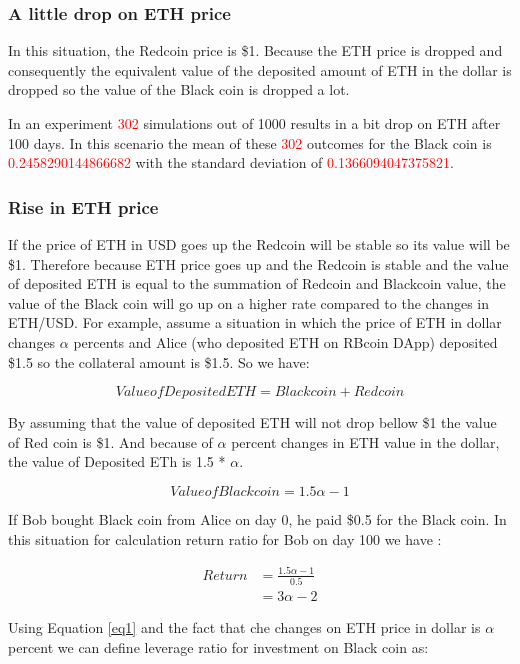 \subsubsection{A little drop on ETH price}
In this situation, the Redcoin price is \$1. Because the ETH price is dropped and consequently the equivalent value of the deposited amount of ETH in the dollar is dropped so the value of the Black coin is dropped a lot.

In an experiment \textcolor{red}{302} simulations out of 1000 results in a bit drop on ETH after 100 days. In this scenario the mean of these \textcolor{red}{302} outcomes for the Black coin is \textcolor{red}{0.2458290144866682} with the standard deviation of \textcolor{red}{0.1366094047375821}. 

\subsubsection{Rise in ETH price}
If the price of ETH in USD goes up the Redcoin will be stable so its value will be \$1. Therefore because ETH price goes up and the Redcoin is stable and the value of deposited ETH is equal to the summation of Redcoin and Blackcoin value, the value of the Black coin will go up on a higher rate compared to the changes in ETH/USD. For example, assume a situation in which the price of ETH in dollar changes $\alpha$ percents and Alice (who deposited ETH on RBcoin DApp) deposited \$1.5 so the collateral amount is \$1.5. So we have:

\[Value of Deposited ETH = Black coin + Red coin\]

By assuming that the value of deposited ETH will not drop bellow \$1 the value of Red coin is \$1. And because of $\alpha$ percent changes in ETH value in the dollar, the value of Deposited ETh is 1.5 * $\alpha$.

\[Value of Black coin = 1.5\alpha - 1\]

If Bob bought Black coin from Alice on day 0, he paid \$0.5 for the Black coin. In this situation for calculation return ratio for Bob on day 100 we have :

\begin{equation} \label{eq1}
\begin{split}
Return & = \frac{1.5\alpha - 1}{0.5} \\
 & = 3\alpha - 2
\end{split}
\end{equation}

Using Equation \ref{eq1} and the fact that che changes on ETH price in dollar is $\alpha$ percent we can define leverage ratio for investment on Black coin as:

